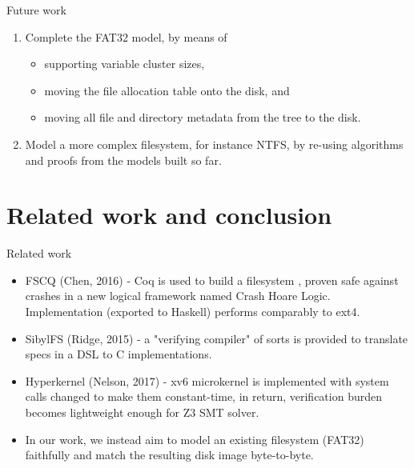 \documentclass{beamer}
\begin{document}
\begin{frame}{Future work}
  \begin{enumerate}
  \item Complete the FAT32 model, by means of
    \begin{itemize}
    \item supporting variable cluster sizes,
    \item moving the file allocation table onto the disk, and
    \item moving all file and directory metadata from the tree to the
      disk.
    \end{itemize}
  \item Model a more complex filesystem, for instance NTFS, by
    re-using algorithms and proofs from the models built so far.
  \end{enumerate}
\end{frame}

\section{Related work and conclusion}

\begin{frame}{Related work}
  \begin{itemize}
  \item FSCQ (Chen, 2016) - Coq is used to build a filesystem , proven
    safe against crashes in a new logical framework named Crash Hoare
    Logic. Implementation (exported to Haskell) performs comparably to
    ext4.
  \item SibylFS (Ridge, 2015) - a "verifying compiler" of sorts is
    provided to translate specs in a DSL to C implementations.
  \item Hyperkernel (Nelson, 2017) - xv6 microkernel is implemented
    with system calls changed to make them constant-time, in return,
    verification burden becomes lightweight enough for Z3 SMT solver.
  \item In our work, we instead aim to model an existing filesystem (FAT32)
    faithfully and match the resulting disk image byte-to-byte.
  \end{itemize}
\end{frame}
\end{document}
